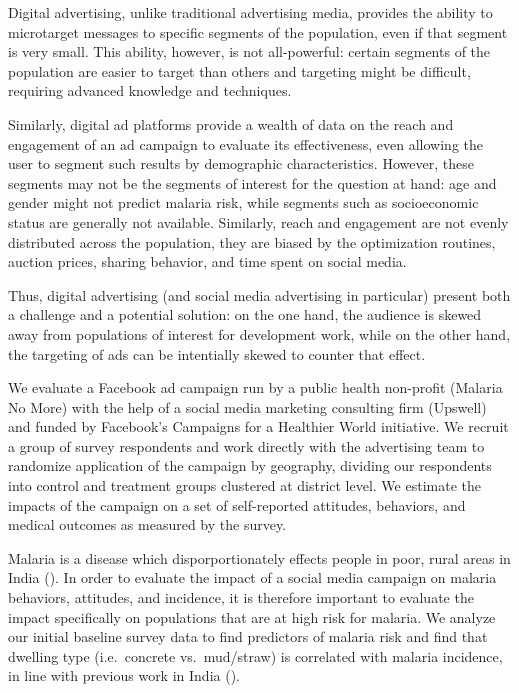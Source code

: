 \documentclass[a4paper,12pt]{article}
\begin{document}
Digital advertising, unlike traditional advertising media, provides the ability to microtarget messages to specific segments of the population, even if that segment is very small. This ability, however, is not all-powerful: certain segments of the population are easier to target than others and targeting might be difficult, requiring advanced knowledge and techniques.

Similarly, digital ad platforms provide a wealth of data on the reach and engagement of an ad campaign to evaluate its effectiveness, even allowing the user to segment such results by demographic characteristics. However, these segments may not be the segments of interest for the question at hand: age and gender might not predict malaria risk, while segments such as socioeconomic status are generally not available. Similarly, reach and engagement are not evenly distributed across the population, they are biased by the optimization routines, auction prices, sharing behavior, and time spent on social media.

Thus, digital advertising (and social media advertising in particular) present both a challenge and a potential solution: on the one hand, the audience is skewed away from populations of interest for development work, while on the other hand, the targeting of ads can be intentially skewed to counter that effect.

We evaluate a Facebook ad campaign run by a public health non-profit (Malaria No More) with the help of a social media marketing consulting firm (Upswell) and funded by Facebook's Campaigns for a Healthier World initiative. We recruit a group of survey respondents and work directly with the advertising team to randomize application of the campaign by geography, dividing our respondents into control and treatment groups clustered at district level. We estimate the impacts of the campaign on a set of self-reported attitudes, behaviors, and medical outcomes as measured by the survey.

Malaria is a disease which disporportionately effects people in poor, rural areas in India (\cite{Dev2004}). In order to evaluate the impact of a social media campaign on malaria behaviors, attitudes, and incidence, it is therefore important to evaluate the impact specifically on populations that are at high risk for malaria. We analyze our initial baseline survey data to find predictors of malaria risk and find that dwelling type (i.e.\ concrete vs.\ mud/straw) is correlated with malaria incidence, in line with previous work in India (\cite{Sharma2015}).
\end{document}
